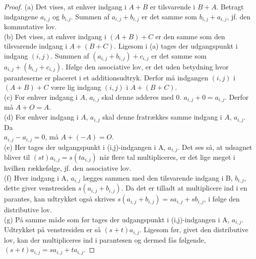 \begin{proof} 
(a) Det vises, at enhver indgang i $A + B$ er tilsvarende i $B + A$. Betragt indgangene $a_{i,j}$ og $b_{i,j}$. Summen af $a_{i,j} + b_{i,j}$ er det samme som $b_{i,j} + a_{i,j}$, jf. den kommutative lov. \\
(b) Det vises, at enhver indgang i $(A + B) + C$ er den samme som den tilsvarende indgang i $A + (B + C)$. Ligesom i (a) tages der udgangspunkt i indgang $(i,j)$. Summen af $(a_{i,j} + b_{i,j}) + c_{i,j}$ er det samme som $a_{i,j} + (b_{i,j} + c_{i,j})$. Ifølge den associative lov, er det uden betydning hvor paranteserne er placeret i et additionsudtryk. Derfor må indgangen $(i,j)$ i $(A + B) + C$ være lig indgang $(i,j)$ i $A + (B + C)$. \\
(c) For enhver indgang i $A$, $a_{i,j}$ skal denne adderes med $0$. $a_{i,j}+0=a_{i,j}$. Derfor må $A + O = A$. \\
(d) For enhver indgang i $A$, $a_{i,j}$ skal denne fratrækkes samme indgang i $A$, $a_{i,j}$. Da \\ $a_{i,j} - a_{i,j} = 0$, må $A + (-A) = O$. \\
(e) Her tages der udgangspunkt i (i,j)-indgangen i A, $a_{i,j}$. Det ses så, at udsagnet bliver til $(st)a_{i,j} = s(ta_{i,j})$ når flere tal multipliceres, er det lige meget i hvilken rækkefølge, jf. den associative lov. \\
(f) Hver indgang i A, $a_{i,j}$ lægges sammen med den tilsvarende indgang i B, $b_{i,j}$, dette giver venstresiden $s(a_{i,j}+b_{i,j})$. Da det er tilladt at multiplicere ind i en parantes, kan udtrykket også skrives $s(a_{i,j}+b_{i,j})=sa_{i,j}+sb_{i,j}$, i følge den distributive lov. \\
(g) På samme måde som før tages der udgangspunkt i (i,j)-indgangen i A, $a_{i,j}$. Udtrykket på venstresiden er så $(s+t)a_{i,j}$. Ligesom før, givet den distributive lov, kan der multipliceres ind i parantesen og dermed fås følgende, $(s+t)a_{i,j}=sa_{i,j}+ta_{i,j}$.
\end{proof}

